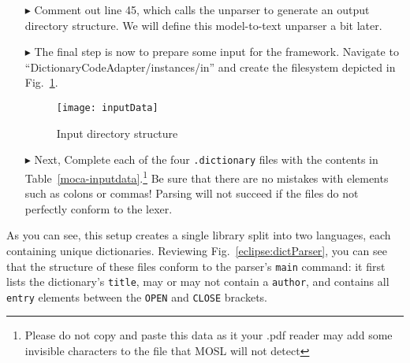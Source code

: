 \begin{itemize}

\item[$\blacktriangleright$] Comment out line 45, which calls the unparser to generate an output directory structure. We will define this model-to-text unparser
a bit later. 

\newpage

\item[$\blacktriangleright$] The final step is now to prepare some input for the framework. Navigate to ``DictionaryCodeAdapter/instances/in'' and create the
filesystem depicted in Fig.~\ref{eclipse:textDirectory}. 

\vspace{1cm}

\begin{figure}[htp]
\begin{center}
  \texttt{[image: inputData]}
  \caption{Input directory structure}
  \label{eclipse:textDirectory}
\end{center}
\end{figure}

\vspace{1cm}

\item[$\blacktriangleright$] Next, Complete each of the four \texttt{.dictionary} files with the contents in Table~\ref{moca-inputdata}.\footnote{Please do not
copy and paste this data as it your .pdf reader may add some invisible characters to the file that MOSL will not detect} Be sure that there are no mistakes with
elements such as colons or commas! Parsing will not succeed if the files do not perfectly conform to the lexer. 

\end{itemize}

As you can see, this setup creates a single library split into two languages, each containing unique dictionaries. Reviewing
Fig.~\ref{eclipse:dictParser}, you can see that the structure of these files conform to the parser's \texttt{main} command: it first lists the dictionary's
\texttt{title}, may or may not contain a \texttt{author}, and contains all \texttt{entry} elements between the \texttt{OPEN} and \texttt{CLOSE} brackets.

